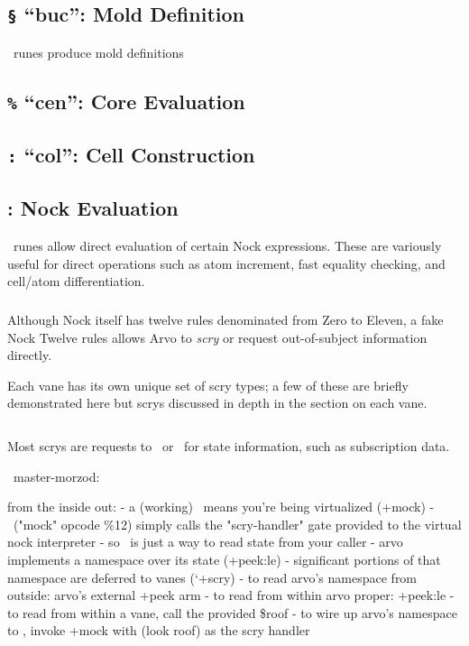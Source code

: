 \subsection{\texttt{\S} “buc”:  Mold Definition}

\pbuc~runes produce mold definitions

\subsection{\texttt{\%} “cen”:  Core Evaluation}

\subsection{\texttt{:} “col”:  Cell Construction}

\subsection{\pdot:  Nock Evaluation}

\pdot~runes allow direct evaluation of certain Nock expressions.  These are variously useful for direct operations such as atom increment, fast equality checking, and cell/atom differentiation.

\subsubsection{\pdotket}

Although Nock itself has twelve rules denominated from Zero to Eleven, a fake Nock Twelve rules allows Arvo to \emph{scry} or request out-of-subject information directly.

Each vane has its own unique set of scry types; a few of these are briefly demonstrated here but scrys discussed in depth in the section on each vane.

\begin{lstlisting}

\end{lstlisting}

Most scrys are requests to \clay~or \gall~for state information, such as subscription data.


~master-morzod:

from the inside out:
- a (working) \dotket~means you're being virtualized (+mock)
- \dotket~("mock" opcode \%12) simply calls the "scry-handler" gate provided to the virtual nock interpreter
- so \dotket~is just a way to read state from your caller
- arvo implements a namespace over its state (+peek:le)
- significant portions of that namespace are deferred to vanes (`+scry)
- to read arvo's namespace from outside: arvo's external +peek arm
- to read from within arvo proper: +peek:le
- to read from within a vane, call the provided \$roof
- to wire up arvo's namespace to \dotket, invoke +mock with (look roof) as the scry handler


